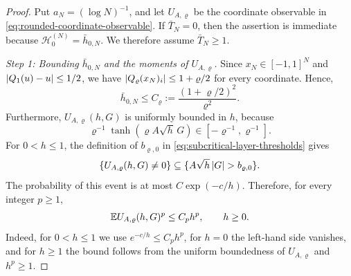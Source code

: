 \documentclass[11pt,reqno,a4paper]{article}
\newcommand{\Ee}{\E}
\begin{document}
\begin{proof}
  Put $a_N=(\log N)^{-1}$, and let $U_{A,\varrho}$ be the coordinate
  observable in \cref{eq:rounded-coordinate-observable}.
  If $\bar T_N=0$, then the assertion is immediate because
  $\mathscr H_0^{(N)}=\bar h_{0,N}$. We therefore assume $\bar T_N\geq1$.

  \emph{Step 1: Bounding $\bar h_{0,N}$ and the moments of
  $U_{A,\varrho}$.}
  Since $x_N\in[-1,1]^N$ and $\abs{Q_1(u)-u}\leq1/2$, we have
  $\abs{Q_\varrho(x_N)_i}\leq1+\varrho/2$ for every coordinate. Hence,
  \begin{equation}\label{eq:subcritical-initial-radius-bound}
    \bar h_{0,N}
    \leq
    C_\varrho
    :=
    \frac{(1+\varrho/2)^2}{\varrho^2}.
  \end{equation}
  Furthermore, $U_{A,\varrho}(h,G)$ is uniformly bounded in $h$, because
  \begin{equation*}
    \varrho^{-1}\tanh(\varrho A\sqrt h\,G)
    \in[-\varrho^{-1},\varrho^{-1}].
  \end{equation*}
  For $0<h\leq1$, the definition of $b_{\varrho,0}$ in
  \cref{eq:subcritical-layer-thresholds} gives
  \begin{equation*}
    \{U_{A,\varrho}(h,G)\neq0\}
    \subseteq
    \{A\sqrt h\,\abs G>b_{\varrho,0}\}.
  \end{equation*}
  The probability of this event is at most $C\exp(-c/h)$. Therefore, for
  every integer $p\geq1$,
  \begin{equation}\label{eq:subcritical-fixed-moment-bound}
    \Ee U_{A,\varrho}(h,G)^p
    \leq
    C_p h^p,
    \qquad h\geq0 .
  \end{equation}
  Indeed, for $0<h\leq1$ we use $e^{-c/h}\leq C_ph^p$, for $h=0$ the
  left-hand side vanishes, and for $h\geq1$ the bound follows from the
  uniform boundedness of $U_{A,\varrho}$ and $h^p\geq1$.


\end{proof}
\end{document}
